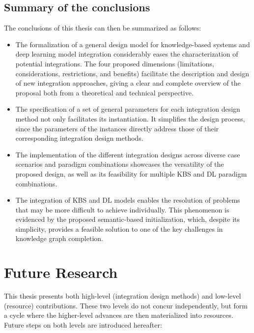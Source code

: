 \subsection{Summary of the conclusions}
The conclusions of this thesis can then be summarized as follows:
\begin{itemize}
    \item The formalization of a general design model for knowledge-based systems and deep learning model integration considerably eases the characterization of potential integrations. The four proposed dimensions (limitations, considerations, restrictions, and benefits) facilitate the description and design of new integration approaches, giving a clear and complete overview of the proposal both from a theoretical and technical perspective. 
    
    \item The specification of a set of general parameters for each integration design method not only facilitates its instantiation. It simplifies the design process, since the parameters of the instances directly address those of their corresponding integration design methods.
    
    \item The implementation of the different integration designs across diverse case scenarios and paradigm combinations showcases the versatility of the proposed design, as well as its feasibility for multiple KBS and DL paradigm combinations. 
    
    \item The integration of KBS and DL models enables the resolution of problems that may be more difficult to achieve individually. This phenomenon is evidenced by the proposed semantic-based initialization, which, despite its simplicity, provides a feasible solution to one of the key challenges in knowledge graph completion.
\end{itemize}

\section{Future Research}\label{7_sec:future_research}
This thesis presents both high-level (integration design methods) and low-level (resource) contributions. These two levels do not concur independently, but form a cycle where the higher-level advances are then materialized into resources. Future steps on both levels are introduced hereafter:


